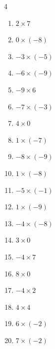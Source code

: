 \begin{multicols}{4}
\begin{enumerate}
  \item $2\times 7$
        \phantom{$=14$}

  \item $0\times (-8)$
        \phantom{$=0$}

\columnbreak %

  \item $-3\times (-5)$
        \phantom{$=15$}

  \item $-6\times (-9)$
        \phantom{$=54$}

  \item $-9\times 6$
        \phantom{$=-54$}

  \item $-7\times (-3)$
        \phantom{$=21$}

  \item $4\times 0$
        \phantom{$=0$}

  \item $1\times (-7)$
        \phantom{$=-7$}

  \item $-8\times (-9)$
        \phantom{$=72$}

  \item $1\times (-8)$
        \phantom{$=-8$}

  \item $-5\times (-1)$
        \phantom{$=5$}

  \item $1\times (-9)$
        \phantom{$=-9$}

  \item $-4\times (-8)$
        \phantom{$=32$}

  \item $3\times 0$
        \phantom{$=0$}

  \item $-4\times 7$
        \phantom{$=-28$}

  \item $8\times 0$
        \phantom{$=0$}

  \item $-4\times 2$
        \phantom{$=-8$}

  \item $4\times 4$
        \phantom{$=16$}

  \item $6\times (-2)$
        \phantom{$=-12$}

  \item $7\times (-2)$
        \phantom{$=-14$}


\end{enumerate}
\end{multicols}
